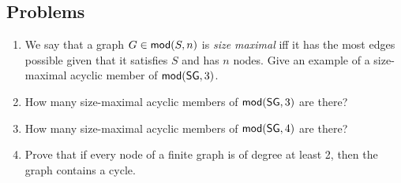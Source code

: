 \newpage
\begin{mdframed}[linewidth=1]
\section*{Problems}
\begin{enumerate}
    \item We say that a graph $G \in \mbox{$\mathsf{mod}(S,n)$}$ is \emph{size maximal} iff it has the most edges possible given that it satisfies $S$ and has $n$ nodes. Give an example of a size-maximal acyclic member of $\mbox{$\mathsf{mod}(\mbox{$\mathsf{SG}$},3)$}$. 

    \item How many size-maximal acyclic members of $\mbox{$\mathsf{mod}(\mbox{$\mathsf{SG}$},3)$}$ are there?

    \item How many size-maximal acyclic members of $\mbox{$\mathsf{mod}(\mbox{$\mathsf{SG}$},4)$}$ are there?

    \item Prove that if every node of a finite graph is of degree at least 2, then the graph contains a cycle. 
\iffalse
\item How many size-maximal members of $\modn{\sg}{6}$ have no 3-cycles? 

    \item Prove the \textbf{Handshake Lemma}: For every graph $G=(V,E)$, $\sum_{v \in V}\deg{v} = 2|E|$. 

    \item Prove that in any graph the number of vertices of odd degree is even.


    \item Let $S$ be the conjunction of 
   \[
       \slo
   \]
   \[
       \forall xy(Lxy \land \lnot \exists z(Lxz \land Lzy)) \supset Fx \oplus Fy
   \]
   \[
       \forall x(\lnot \exists y(Lyx))\supset Fx
   \]
   \[
       \forall x(\lnot \exists y(Lxy))\supset \lnot Fx
   \]
   What is $Spec(S)$?

   \item Give a schema $S$ such that $Spec(S) = \{2i + 1 | i \in \mathbb{N}\}$, ie the set of odd positive numbers. 

   \item What is $Spec(SLO)$?

   \item Let $S$ be the conjunction of 
   \[
       \slo
   \]
   \[
       \forall x \exists y Lxy
   \]
   \[
       \forall x \exists y Lyx
   \]
   \[
       \forall xy(Lxy \supset \exists z(Lxz \land Lzy))
   \]
   What is $Spec(S)$?

   \item Let $S$ be the conjunction of
   \[
       \forall x((\forall y \lnot Lxy) \vee \exists yz((y \neq z) \land \forall u(Lxu \equiv u = y \vee u = z)))
   \]
   \[
       \forall xy(Lxy \supset \lnot Lyx)
   \]
   \[
       \exists x(\forall y \lnot Lyx \land \forall y(y \neq x \supset \exists u \forall w(Lwy \equiv u = w)))
   \]
   what is $Spec(S)$?
\fi
\end{enumerate}
\end{mdframed}

